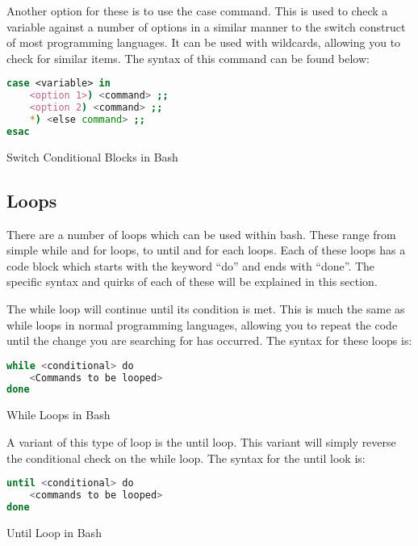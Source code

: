 			Another option for these is to use the case command.
			This is used to check a variable against a number of options in a similar manner to the switch construct of most programming languages.
			It can be used with wildcards, allowing you to check for similar items.
			The syntax of this command can be found below:
			\begin{code}
			\begin{lstlisting}[language=bash]
case <variable> in
	<option 1>) <command> ;;
	<option 2) <command> ;;
	*) <else command> ;;
esac
			\end{lstlisting}
			\label{code:SwitchConditionalBlock}
			\caption{Switch Conditional Blocks in Bash}
			\end{code}
		\subsection{Loops}
			There are a number of loops which can be used within bash.
			These range from simple while and for loops, to until  and for each loops.
			Each of these loops has a code block which starts with the keyword ``do'' and ends with ``done''.
			The specific syntax and quirks of each of these will be explained in this section.

			The while loop will continue until its condition is met.
			This is much the same as while loops in normal programming languages, allowing you to repeat the code until the change you are searching for has occurred.
			The syntax for these loops is:
			\begin{code}
			\begin{lstlisting}[language=bash]
while <conditional> do
	<Commands to be looped>
done
			\end{lstlisting}
			\label{code:WhileBashLoops}
			\caption{While Loops in Bash}
			\end{code}
			A variant of this type of loop is the until loop.
			This variant will simply reverse the conditional check on the while loop.
			The syntax for the until look is:
			\begin{code}
			\begin{lstlisting}[language=bash]
until <conditional> do
	<commands to be looped>
done
			\end{lstlisting}
			\label{code:BashLoopsUntil}
			\caption{Until Loop in Bash}
			\end{code}

